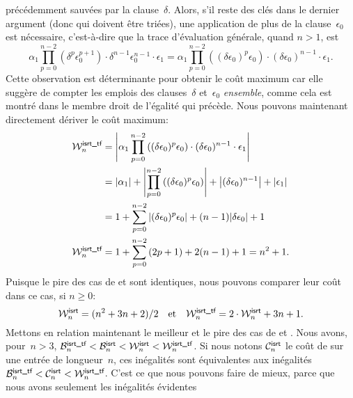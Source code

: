 précédemment sauvées par la clause~\(\delta\). Alors, s'il reste des
clés dans le dernier argument (donc qui doivent être triées), une
application de plus de la clause~\(\epsilon_0\) est nécessaire,
c'est-à-dire que la trace d'évaluation générale, quand \(n > 1\), est
\begin{equation*}
\alpha_1\prod_{p=0}^{n-2}{\left(\delta^p\epsilon_0^{p+1}\right)} \cdot
\delta^{n-1}\epsilon_0^{n-1} \cdot \epsilon_1
= \alpha_1\prod_{p=0}^{n-2}{\left((\delta\epsilon_0)^p\epsilon_0\right)}
\cdot (\delta\epsilon_0)^{n-1} \cdot \epsilon_1.
\end{equation*}
Cette observation est déterminante pour obtenir le coût maximum car
elle suggère de compter les emplois des clauses~\(\delta\)
et~\(\epsilon_0\) \emph{ensemble}, comme cela est montré dans le
membre droit de l'égalité qui précède. Nous pouvons maintenant
directement dériver le coût maximum:
\begin{align*}
  \W{\fun{isrt\_tf}}{n}
  &= \left|\alpha_1\prod_{p=0}^{n-2}{\left((\delta\epsilon_0)^p\epsilon_0\right)}
     \cdot (\delta\epsilon_0)^{n-1} \cdot \epsilon_1\right|\\
  &= \len{\alpha_1} +
     \left|\prod_{p=0}^{n-2}{\left((\delta\epsilon_0)^p\epsilon_0\right)}\right|
     + \left|(\delta\epsilon_0)^{n-1}\right| + \len{\epsilon_1}\\
  &= 1 + \sum_{p=0}^{n-2}{\left|(\delta\epsilon_0)^p\epsilon_0\right|}
     + (n-1)\len{\delta\epsilon_0} + 1\\
\W{\fun{isrt\_tf}}{n}
  &= 1 + \sum_{p=0}^{n-2}{(2p+1)} + 2(n-1) + 1 = n^2 + 1.
\end{align*}
Puisque le pire des cas de  et 
sont identiques, nous pouvons comparer leur coût dans ce cas, si
\(n\geqslant{}0\):
\begin{equation*}
\W{\fun{isrt}}{n}     = (n^2 + 3n + 2)/2
\quad\text{et}\quad
\W{\fun{isrt\_tf}}{n} = 2 \cdot \W{\fun{isrt}}{n}  + 3n + 1.
\end{equation*}
Mettons en relation maintenant le meilleur et le pire des cas de
 et . Nous avons, pour~\(n>3\),
\(\B{\smash[t]{\fun{isrt\_tf}}}{n} < \B{\fun{isrt}}{n} <
\W{\fun{isrt}}{n} < \W{\smash[t]{\fun{isrt\_tf}}}{n}\). Si nous notons
\(\C{\fun{isrt}}{n}\) le coût de  sur une entrée de
longueur~\(n\), ces inégalités sont équivalentes aux inégalités \(
\B{\smash[t]{\fun{isrt\_tf}}}{n} < \C{\fun{isrt}}{n} <
\W{\smash[t]{\fun{isrt\_tf}}}{n}\).  C'est ce que nous pouvons faire
de mieux, parce que nous avons seulement les inégalités évidentes

